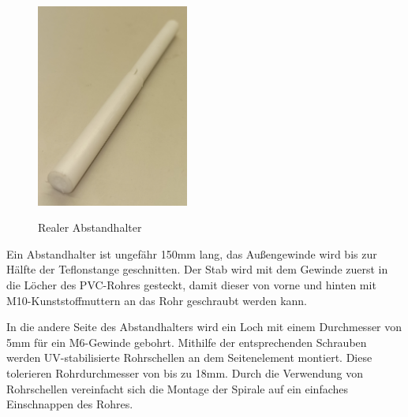 \begin{figure}[H]
	\centering
	\includegraphics[width=5cm]{../ref/Abstandhalter-real.jpg}
	\label{fig:Abstandhalter-real}
	\caption{Realer Abstandhalter}
\end{figure}

Ein Abstandhalter ist ungefähr 150mm lang, das Außengewinde wird bis zur Hälfte der Teflonstange geschnitten. Der Stab wird mit dem Gewinde zuerst in die Löcher des PVC-Rohres gesteckt, damit dieser von vorne und hinten mit M10-Kunststoffmuttern an das Rohr geschraubt werden kann.

In die andere Seite des Abstandhalters wird ein Loch mit einem Durchmesser von 5mm für ein M6-Gewinde gebohrt. Mithilfe der entsprechenden Schrauben werden UV-stabilisierte Rohrschellen an dem Seitenelement montiert. Diese tolerieren Rohrdurchmesser von bis zu 18mm. Durch die Verwendung von Rohrschellen vereinfacht sich die Montage der Spirale auf ein einfaches Einschnappen des Rohres.

